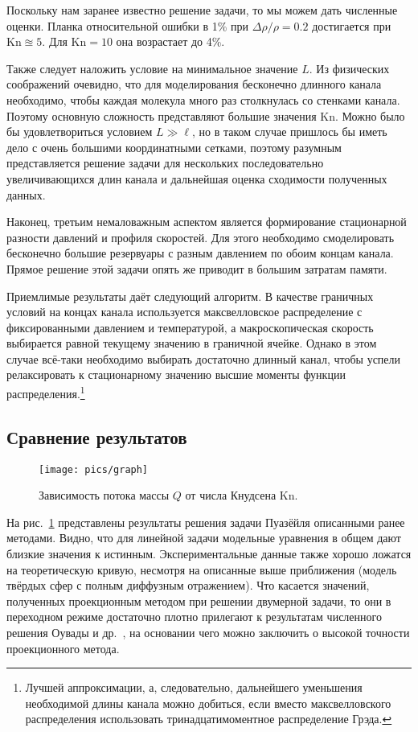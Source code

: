 \documentclass[a4paper,12pt]{article}
\newcommand{\Kn}{\mathrm{Kn}}
\begin{document}
Поскольку нам заранее известно решение задачи, то мы можем дать численные оценки.
Планка относительной ошибки в 1\% при \(\Delta\rho/\rho = 0.2\) достигается при \(\Kn \approxeq 5\).
Для \(\Kn=10\) она возрастает до 4\%.

Также следует наложить условие на минимальное значение \(L\). Из физических соображений очевидно, что
для моделирования бесконечно длинного канала необходимо, чтобы каждая молекула много раз столкнулась со
стенками канала. Поэтому основную сложность представляют большие значения \(\Kn\). Можно было бы удовлетвориться
условием \(L \gg \ell\), но в таком случае пришлось бы иметь дело с очень большими координатными сетками,
поэтому разумным представляется решение задачи для нескольких последовательно увеличивающихся длин канала и
дальнейшая оценка сходимости полученных данных.

Наконец, третьим немаловажным аспектом является формирование стационарной разности давлений и профиля скоростей.
Для этого необходимо смоделировать бесконечно большие резервуары с разным давлением по обоим концам канала.
Прямое решение этой задачи опять же приводит в большим затратам памяти.

Приемлимые результаты даёт следующий алгоритм.
В качестве граничных условий на концах канала используется максвелловское распределение с фиксированными давлением и температурой,
а макроскопическая скорость выбирается равной текущему значению в граничной ячейке.
Однако в этом случае всё-таки необходимо выбирать достаточно длинный канал,
чтобы успели релаксировать к стационарному значению высшие моменты функции распределения.\footnote
{
	Лучшей аппроксимации, а, следовательно, дальнейшего уменьшения необходимой длины канала можно добиться,
	если вместо максвелловского распределения использовать тринадцатимоментное распределение Грэда.
}

\subsection{Сравнение результатов}

\begin{figure}[ht]
	\centering
	\texttt{[image: pics/graph]}
	\caption{Зависимость потока массы \(Q\) от числа Кнудсена \(\Kn\).}\label{fig:graph}
\end{figure}

На рис.~\ref{fig:graph} представлены результаты решения задачи Пуазёйля описанными ранее методами.
Видно, что для линейной задачи модельные уравнения в общем дают близкие значения к истинным.
Экспериментальные данные также хорошо ложатся на теоретическую кривую,
несмотря на описанные выше приближения (модель твёрдых сфер с полным диффузным отражением).
Что касается значений, полученных проекционным методом при решении двумерной задачи,
то они в переходном режиме достаточно плотно прилегают к результатам численного решения Оувады и др.~\cite{Ohwada1989b},
на основании чего можно заключить о высокой точности проекционного метода.
\end{document}
